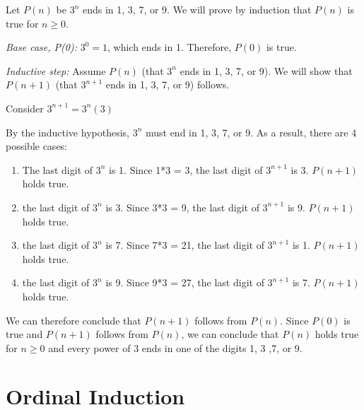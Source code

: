 \documentclass[solution, letterpaper]{cs20}
\begin{document}
        \begin{solution}

        Let $P(n)$ be $3^n$ ends in 1, 3, 7, or 9. We will prove by induction that $P(n)$ is true for $n\geq0$.

        \textit{Base case, P(0):} $3^0 = 1$, which ends in 1. Therefore, $P(0)$ is true.

        \textit{Inductive step:} Assume $P(n)$ (that $3^n$ ends in 1, 3, 7, or 9). We will show that $P(n+1)$ (that $3^{n+1}$ ends in 1, 3, 7, or 9) follows.

        Consider $3^{n+1} = 3^n (3)$

        By the inductive hypothesis, $3^n$ must end in 1, 3, 7, or 9. As a result, there are 4 possible cases:

        \begin{enumerate}

        \item The last digit of $3^n$ is 1. Since 1*3 = 3, the last digit of $3^{n+1}$ is 3. $P(n+1)$ holds true.

        \item the last digit of $3^n$ is 3. Since 3*3 = 9, the last digit of $3^{n+1}$ is 9. $P(n+1)$ holds true.

        \item the last digit of $3^n$ is 7. Since 7*3 = 21, the last digit of $3^{n+1}$ is 1. $P(n+1)$ holds true.

        \item the last digit of $3^n$ is 9. Since 9*3 = 27, the last digit of $3^{n+1}$ is 7. $P(n+1)$ holds true.

        \end{enumerate}

        We can therefore conclude that $P(n+1)$ follows from $P(n)$. Since $P(0)$ is true and $P(n+1)$ follows from $P(n)$, we can conclude that $P(n)$ holds true for $n \geq 0$ and every power of $3$ ends in one of the digits 1, 3 ,7, or 9.

        \end{solution}

	\section{Ordinal Induction}
\end{document}
